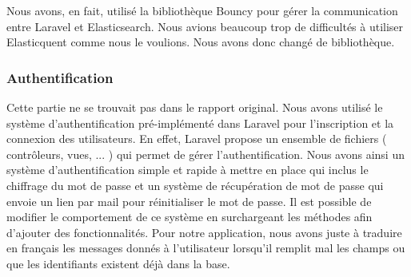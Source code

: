 Nous avons, en fait, utilisé la bibliothèque Bouncy\cite{GitBouncy} pour gérer la communication entre Laravel et Elasticsearch. Nous avions beaucoup trop de difficultés à utiliser Elasticquent comme nous le voulions. Nous avons donc changé de bibliothèque.

\subsubsection{Authentification}

Cette partie ne se trouvait pas dans le rapport original. Nous avons utilisé le système d'authentification pré-implémenté dans Laravel pour l'inscription et la connexion des utilisateurs. En effet, Laravel propose un ensemble de fichiers ( contrôleurs, vues, ... ) qui permet de gérer l'authentification. Nous avons ainsi un système d'authentification simple et rapide à mettre en place qui inclus le chiffrage du mot de passe et un système de récupération de mot de passe qui envoie un lien par mail pour réinitialiser le mot de passe. Il est possible de modifier le comportement de ce système en surchargeant les méthodes afin d'ajouter des fonctionnalités. Pour notre application, nous avons juste à traduire en français les messages donnés à l'utilisateur lorsqu'il remplit mal les champs ou que les identifiants existent déjà dans la base.
